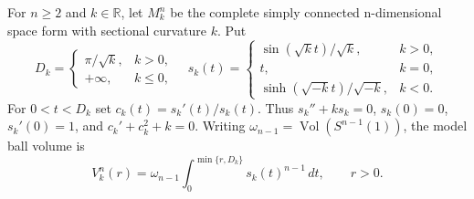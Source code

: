 For \(n\ge2\) and \(k\in\mathbb R\), let \(M_k^n\) be the complete simply connected n-dimensional space form with sectional curvature \(k\). Put
\[
D_k=\begin{cases}\pi/\sqrt{k},&k>0,\\+\infty,&k\le0,\end{cases}
\quad
s_k(t)=\begin{cases}\sin(\sqrt{k}t)/\sqrt{k},&k>0,\\t,&k=0,\\\sinh(\sqrt{-k}t)/\sqrt{-k},&k<0.\end{cases}
\]
For \(0<t<D_k\) set \(c_k(t)=s_k'(t)/s_k(t)\). Thus
\(s_k''+ks_k=0\), \(s_k(0)=0\), \(s_k'(0)=1\), and \(c_k'+c_k^2+k=0\).
Writing \(\omega_{n-1}=\operatorname{Vol}(S^{n-1}(1))\), the model ball volume is
\[
V_k^n(r)=\omega_{n-1}\int_0^{\min\{r,D_k\}}s_k(t)^{n-1}\,dt,\qquad r>0.
\]